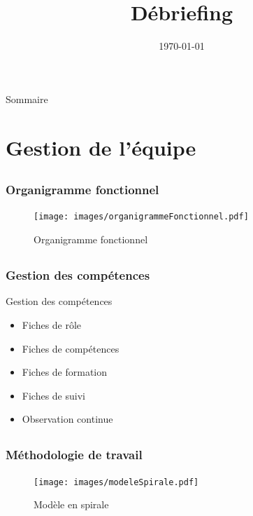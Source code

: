 \documentclass[compress,xcolor=dvipsnames]{beamer}
\title{Débriefing \CP}
\date{\today}
\author{\Sergi}
\institute{\insa}
\begin{document}
\begin{frame}[plain]
	\titlepage
\end{frame}


\begin{frame}{Sommaire}
	\tableofcontents[hideallsubsections]
\end{frame}



\section[Gestion de l'équipe]{Gestion de l'équipe}
\subsection{}
\begin{frame}
\frametitle{Organigramme fonctionnel}
\begin{figure}
	\texttt{[image: images/organigrammeFonctionnel.pdf]}
	\caption{Organigramme fonctionnel}
	\label{OF}
\end{figure}
\end{frame}


\subsection{}
\begin{frame}
\frametitle{Gestion des compétences}
\begin{block}{Gestion des compétences}
\begin{itemize}
	\item Fiches de rôle
	\item Fiches de compétences
	\item Fiches de formation
	\item Fiches de suivi
	\item Observation continue
\end{itemize}
\end{block}
\end{frame}


\subsection{}
\begin{frame}
\frametitle{Méthodologie de travail}
\begin{figure}
\begin{center}
\texttt{[image: images/modeleSpirale.pdf]}
\caption{Modèle en spirale}
\label{MS}
\end{center}
\end{figure}
\end{frame}
\end{document}
